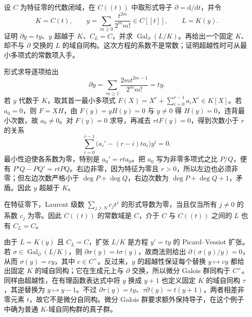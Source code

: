 \begin{optionalexercise}\label{b1:ex:D-exponential-series}
	设 \(C\) 为特征零的代数闭域，在 \(C(\!(t)\!)\) 中取形式导子 \(\partial=\mathrm d/\mathrm dt\)，并令
	\[
		K=C(t),\qquad y=\sum_{m\geq0}\dfrac{t^{2m}}{2^m m!}\in C[\![t]\!],\qquad L=K(y).
	\]
	证明 \(\partial y=ty\)、\(y\) 超越于 \(K\)、\(C_L=C\)，并求 \(\operatorname{Gal}_{\partial}(L/K)\)。再给出一个固定 \(K\)、却不与 \(\partial\) 交换的 \(L\) 的域自同构。这次方程的系数不是常数；证明超越性时可从最小多项式的常数项入手。
\end{optionalexercise}

\begin{solution}
	形式求导逐项给出
	\[
		\partial y=\sum_{m\geq1}\dfrac{2m t^{2m-1}}{2^m m!}=ty.
	\]
	若 \(y\) 代数于 \(K\)，取其首一最小多项式 \(F(X)=X^r+\sum_{i=0}^{r-1}a_iX^i\in K[X]\)。若 \(a_0=0\)，则 \(F=XH\)，由 \(F(y)=yH(y)=0\) 与 \(y\neq0\) 得 \(H(y)=0\)，违背最小次数，故 \(a_0\neq0\)。对 \(F(y)=0\) 求导，再减去 \(rtF(y)=0\)，得到次数小于 \(r\) 的关系
	\[
		\sum_{i=0}^{r-1}\bigl(a_i'-(r-i)ta_i\bigr)y^i=0.
	\]
	最小性迫使各系数为零，特别是 \(a_0'=rt a_0\)。把 \(a_0\) 写为非零多项式之比 \(P/Q\)，便有 \(P'Q-PQ'=rtPQ\)。右边非零，因为特征为零且 \(r>0\)，所以左边也必须非零；但左边次数严格小于 \(\deg P+\deg Q\)，右边次数为 \(\deg P+\deg Q+1\)，矛盾。因此 \(y\) 超越于 \(K\)。

	在特征零下，Laurent 级数 \(\sum_{j\geq N}c_jt^j\) 的形式导数为零，当且仅当所有 \(j\neq0\) 的系数 \(c_j\) 为零。因此 \(C(\!(t)\!)\) 的常数域是 \(C\)，介于 \(C\) 与 \(C(\!(t)\!)\) 之间的 \(L\) 也有 \(C_L=C\)。

	由于 \(L=K(y)\) 且 \(C_L=C\)，扩张 \(L/K\) 是方程 \(y'=ty\) 的 Picard--Vessiot 扩张。若 \(\sigma\in\operatorname{Gal}_{\partial}(L/K)\)，则 \(\partial\sigma(y)=t\sigma(y)\)，故商法则给出 \(\partial(\sigma(y)/y)=0\)，从而 \(\sigma(y)=cy\)，其中 \(c\in C^\times\)。反过来，\(y\) 的超越性保证每个替换 \(y\mapsto cy\) 都给出固定 \(K\) 的域自同构；它在生成元上与 \(\partial\) 交换，所以微分 Galois 群同构于 \(C^\times\)。同样由超越性，在有理函数表达式中将 \(y\) 换成 \(y+1\) 也定义固定 \(K\) 的域自同构 \(\tau\)，其逆替换为 \(y\mapsto y-1\)。不过 \(\partial\tau(y)=ty\)、\(\tau\partial(y)=t(y+1)\)，两者相差非零元素 \(t\)，故它不是微分自同构。微分 Galois 群要求额外保持导子，在这个例子中确为普通 \(K\)-域自同构群的真子群。
\end{solution}
